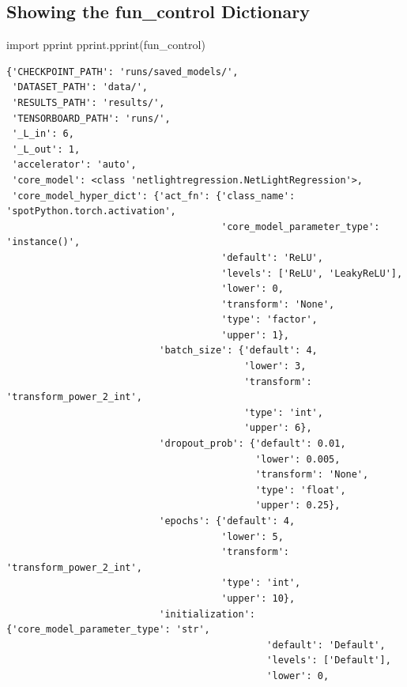 \documentclass[
  letterpaper,
  DIV=11,
  numbers=noendperiod]{scrreprt}
\newenvironment{Shaded}{\begin{snugshade}}{\end{snugshade}}
\newcommand{\ImportTok}[1]{\textcolor[rgb]{0.00,0.46,0.62}{#1}}
\newcommand{\NormalTok}[1]{\textcolor[rgb]{0.00,0.23,0.31}{#1}}
\begin{document}
\subsection{Showing the fun\_control
Dictionary}\label{sec-show-fun-control-33}

\begin{Shaded}
\begin{Highlighting}[]
\ImportTok{import}\NormalTok{ pprint}
\NormalTok{pprint.pprint(fun\_control)}
\end{Highlighting}
\end{Shaded}

\begin{verbatim}
{'CHECKPOINT_PATH': 'runs/saved_models/',
 'DATASET_PATH': 'data/',
 'RESULTS_PATH': 'results/',
 'TENSORBOARD_PATH': 'runs/',
 '_L_in': 6,
 '_L_out': 1,
 'accelerator': 'auto',
 'core_model': <class 'netlightregression.NetLightRegression'>,
 'core_model_hyper_dict': {'act_fn': {'class_name': 'spotPython.torch.activation',
                                      'core_model_parameter_type': 'instance()',
                                      'default': 'ReLU',
                                      'levels': ['ReLU', 'LeakyReLU'],
                                      'lower': 0,
                                      'transform': 'None',
                                      'type': 'factor',
                                      'upper': 1},
                           'batch_size': {'default': 4,
                                          'lower': 3,
                                          'transform': 'transform_power_2_int',
                                          'type': 'int',
                                          'upper': 6},
                           'dropout_prob': {'default': 0.01,
                                            'lower': 0.005,
                                            'transform': 'None',
                                            'type': 'float',
                                            'upper': 0.25},
                           'epochs': {'default': 4,
                                      'lower': 5,
                                      'transform': 'transform_power_2_int',
                                      'type': 'int',
                                      'upper': 10},
                           'initialization': {'core_model_parameter_type': 'str',
                                              'default': 'Default',
                                              'levels': ['Default'],
                                              'lower': 0,

\end{verbatim}
\end{document}
